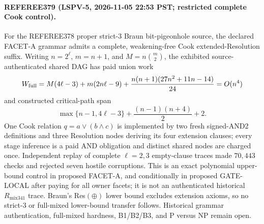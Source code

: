 \paragraph{REFEREE379 (LSPV-5, 2026-11-05 22:53 PST; restricted complete Cook control).}
For the REFEREE378 proper strict-$3$ Braun bit-pigeonhole source, the declared FACET-A grammar admits a complete, weakening-free Cook extended-Resolution suffix.  Writing $n=2^\ell$, $m=n+1$, and $M=n\binom{m}{2}$, the exhibited source-authenticated shared DAG has paid union work
\[
 W_{\rm full}=M(4\ell-3)+m(2n\ell-9)
 +\frac{n(n+1)(27n^2+11n-14)}{24}=O(n^4)
\]
and constructed critical-path span
\[
 \max\{n-1,4\ell-3\}+\frac{(n-1)(n+4)}2+2.
\]
One Cook relation $q=a\vee(b\wedge c)$ is implemented by two fresh signed-AND2 definitions and three Resolution nodes deriving its four extension clauses; every stage inference is a paid AND obligation and distinct shared nodes are charged once.  Independent replay of complete $\ell=2,3$ empty-clause traces made $70{,}443$ checks and rejected seven hostile corruptions.  This is an exact polynomial upper-bound control in proposed FACET-A, and conditionally in proposed GATE-LOCAL after paying for all owner facets; it is not an authenticated historical $R_{\mathrm{mix341}}$ trace.  Braun's Res$(\oplus)$ lower bound excludes extension axioms, so no strict-$3$ or full-mixed lower-bound transfer follows.  Historical grammar authentication, full-mixed hardness, B1/B2/B3, and P versus NP remain open.
